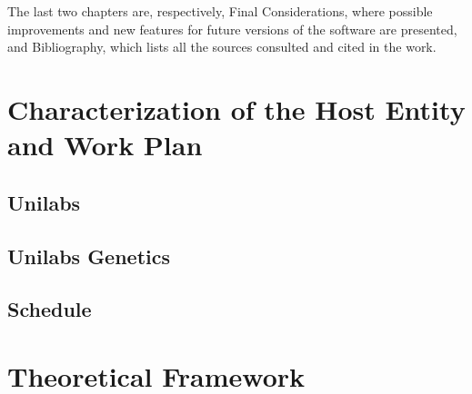 The last two chapters are, respectively, Final Considerations, where possible improvements and new features for future versions of the software are presented, and Bibliography, which lists all the sources consulted and cited in the work.

\section{Characterization of the Host Entity and Work Plan}
\subsection{Unilabs}
\subsection{Unilabs Genetics}
\subsection{Schedule}

\section{Theoretical Framework}